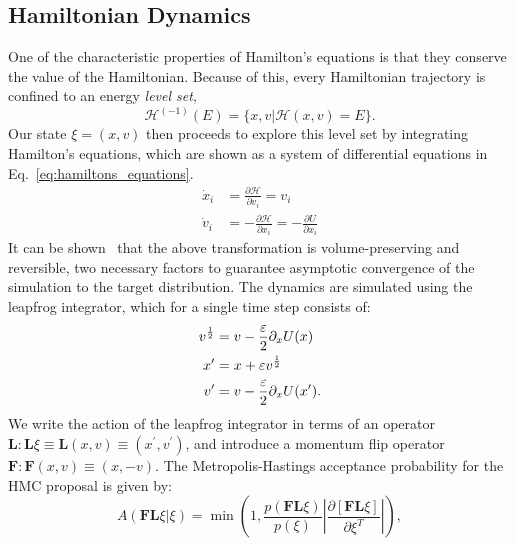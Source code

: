\documentclass[../main.tex]{subfiles}
\begin{document}
\subsection{Hamiltonian Dynamics}
\label{subsec:mcmc_hamiltonian_dynamics}
%
One of the characteristic properties of Hamilton's equations is that they conserve the value of the Hamiltonian.
%
Because of this, every Hamiltonian trajectory is confined to an energy \emph{level set},
%
\begin{equation}
  \mathcal{H}^{(-1)}(E) = \{x, v | \mathcal{H}(x, v) = E\}.
\end{equation}
%
Our state $\xi = (x, v)$ then proceeds to explore this level set by integrating Hamilton's equations, which are shown
as a system of differential equations in Eq.~\ref{eq:hamiltons_equations}.
%
%
\begin{align}
    \dot x_i &= \frac{\partial \mathcal{H}}{\partial v_i} = v_i\\
    \dot v_i &= -\frac{\partial \mathcal{H}}{\partial x_i} = - \frac{\partial
        U}{\partial x_i}
\label{eq:hamiltons_equations}
\end{align}
%
It can be shown~\cite{Neal_2012} that the above transformation is volume-preserving and reversible, two
necessary factors to guarantee asymptotic convergence of the simulation to the target distribution.
%
The dynamics are simulated using the leapfrog integrator, which for a single time step consists of:
%
\begin{align}
    v^{\frac{1}{2}} &= v - \frac{{\varepsilon}}{2} \partial_x U(x)\\
    x^{\prime} &= x + {\varepsilon} v^{\frac{1}{2}}\\
    v^{\prime} &= v - \frac{{\varepsilon}}{2} \partial_x U(x^{\prime}).
    \label{eq:generic_leapfrog}
\end{align}
%
We write the action of the leapfrog integrator in terms of an operator $\mathbf{L}: \mathbf{L}\xi \equiv \mathbf{L}(x,
v) \equiv (x^{\prime}, v^{\prime})$, and introduce a momentum flip operator $\mathbf{F}: \mathbf{F}(x, v) \equiv (x,
-v)$.
%
The Metropolis-Hastings acceptance probability for the HMC proposal is given by:
%
\begin{equation}
    A(\mathbf{F}\mathbf{L} \xi | \xi) = \min\left(1,
        \frac{p(\mathbf{F}\mathbf{L}\xi)}{p(\xi)}\left|
        \frac{\partial\left[\mathbf{F}\mathbf{L}\xi\right]}
        {\partial\xi^{T}}\right|\right),
\label{eq:metropolis_hastings}
\end{equation}
\end{document}
